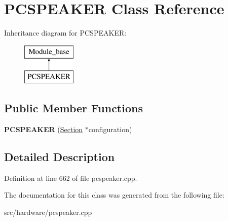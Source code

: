 \hypertarget{classPCSPEAKER}{\section{P\-C\-S\-P\-E\-A\-K\-E\-R Class Reference}
\label{classPCSPEAKER}
}
Inheritance diagram for P\-C\-S\-P\-E\-A\-K\-E\-R\-:\begin{figure}[H]
\begin{center}
\leavevmode
\includegraphics[height=2.000000cm]{classPCSPEAKER}
\end{center}
\end{figure}
\subsection*{Public Member Functions}
\begin{DoxyCompactItemize}
\item 
\hypertarget{classPCSPEAKER_a7c610f8af87ac405537da150878488aa}{{\bfseries P\-C\-S\-P\-E\-A\-K\-E\-R} (\hyperlink{classSection}{Section} $\ast$configuration)}\label{classPCSPEAKER_a7c610f8af87ac405537da150878488aa}

\end{DoxyCompactItemize}


\subsection{Detailed Description}


Definition at line 662 of file pcspeaker.\-cpp.



The documentation for this class was generated from the following file\-:\begin{DoxyCompactItemize}
\item 
src/hardware/pcspeaker.\-cpp\end{DoxyCompactItemize}
